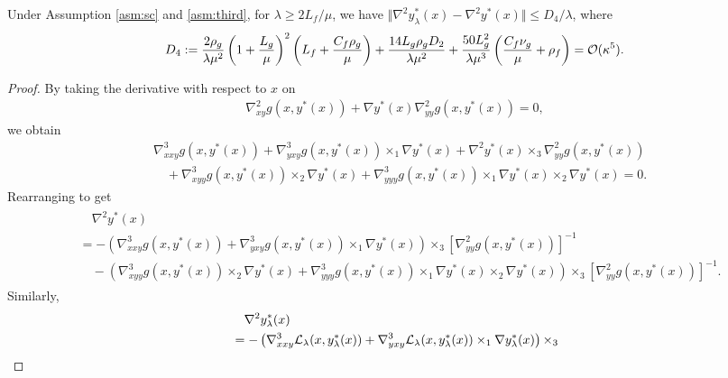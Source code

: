 \begin{lem} \label{lem:nabla2-yx}
Under Assumption \ref{asm:sc} and \ref{asm:third}, 
for $\lambda \ge  2L_f / \mu$,
we have $ \Vert \nabla^2 y_{\lambda}^*(x) - \nabla^2 y^*(x) \Vert \le D_4 /\lambda$, where 
\begin{align*}
    D_4 := \frac{2\rho_g}{\lambda \mu^2}  \left( 1 + \frac{L_g}{\mu}\right)^2  \left(L_f + 
     \frac{C_f \rho_g}{\mu}
     \right) +   \frac{14 L_g \rho_g D_2}{\lambda \mu^2} + \frac{50 L_g^2 }{\lambda \mu^3} \left( \frac{C_f \nu_g}{\mu} + \rho_f \right) = {\mathcal{O}}(\kappa^5).
\end{align*}
\end{lem}

\begin{proof}
    By taking the derivative with respect to $x$ on
    \begin{align*}
        \nabla_{xy}^2 g(x,y^*(x)) + \nabla y^*(x) \nabla_{yy}^2 g(x,y^*(x)) =0,
    \end{align*}
    we obtain
    \begin{align*}
        & \nabla_{xxy}^3 g(x,y^*(x)) + \nabla_{yxy}^3 g(x,y^*(x)) \times_{1}  \nabla y^*(x) + \nabla^2 y^*(x) \times_3 \nabla_{yy}^2 g(x,y^*(x)) \\
        &\quad + \nabla_{xyy}^3 g(x,y^*(x)) \times_2 \nabla y^*(x)  +\nabla_{yyy}^3 g(x,y^*(x)) \times_1 \nabla y^*(x) \times_2 \nabla y^*(x) = 0.
    \end{align*}
    Rearranging to get
    {\begin{align} \label{eq:nabla2-yx}
    \begin{split}
        &\quad \nabla^2 y^*(x) \\
        &= -\left( \nabla_{xxy}^3 g(x,y^*(x)) + \nabla_{yxy}^3 g(x,y^*(x)) \times_1 \nabla y^*(x) 
        \right)  \times_3 [\nabla_{yy}^2 g(x,y^*(x))]^{-1} \\
        &\quad -\left(
        \nabla_{xyy}^3 g(x,y^*(x)) \times_2 \nabla y^*(x)  + \nabla_{yyy}^3 g(x,y^*(x)) \times_1 \nabla y^*(x) \times_2 \nabla y^*(x)   \right) \times_3 [\nabla_{yy}^2 g(x,y^*(x))]^{-1}.
    \end{split}
    \end{align}}
    Similarly,
    {
    \begin{align} \label{eq:nabla2-yx-lambda}
    \begin{split}
        &\quad \nabla^2 y_{\lambda}^*(x) \\ &= -\left( \nabla_{xxy}^3 \fL_{\lambda} (x, y_{\lambda}^*(x)) + \nabla_{yxy}^3 \fL_\lambda(x, y_{\lambda}^*(x)) \times_1 \nabla y_{\lambda}^*(x)  \right) \times_3

\end{split}
\end{align}}
\end{proof}
